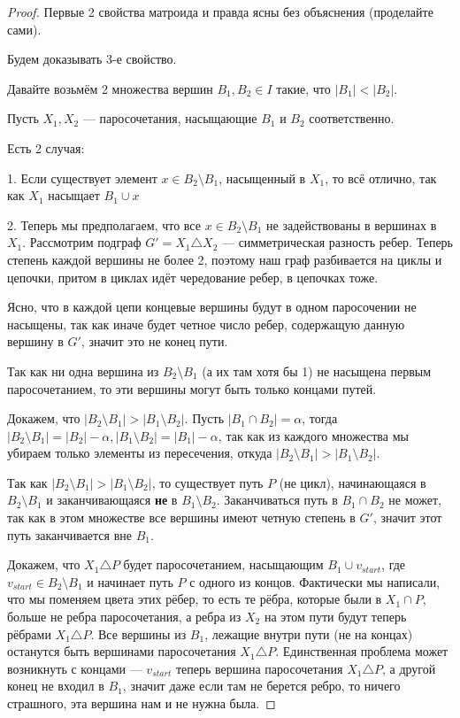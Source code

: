 \documentclass[a4paper, 12pt]{article}
\begin{document}
\begin{proof}
  Первые 2 свойства матроида и правда ясны без объяснения (проделайте сами).

  Будем доказывать 3-е свойство.

  Давайте возьмём 2 множества вершин $B_1, B_2 \in I$ такие, что $|B_1| < |B_2|$.

  Пусть $X_1, X_2$ --- паросочетания, насыщающие $B_1$ и $B_2$ 
  соответственно.

  Есть 2 случая:

  1. Если существует элемент $x \in B_2 \setminus B_1$, насыщенный в $X_1$, то всё
  отлично, так как $X_1$ насыщает $B_1 \cup x$ 

  2. Теперь мы предполагаем, что все $x \in B_2 \setminus B_1$ не задействованы
  в вершинах в $X_1$. Рассмотрим подграф $G' = X_1 \triangle X_2$ --- 
  симметрическая разность ребер. Теперь степень каждой вершины не более 2, поэтому
  наш граф разбивается на циклы и цепочки, притом в циклах идёт чередование ребер,
  в цепочках тоже.

  Ясно, что в каждой цепи концевые вершины будут в одном паросочении не насыщены, так
  как иначе будет 
  четное число ребер, содержащую данную вершину в $G'$, значит это не конец пути.

  Так как ни одна вершина из $B_2 \setminus B_1$ (а их там хотя бы 1) не насыщена
  первым паросочетанием, то эти вершины могут быть только концами путей.

  Докажем, что $|B_2 \setminus B_1| > |B_1 \setminus B_2|$. Пусть $|B_1 \cap B_2| 
  = \alpha$, тогда $|B_2 \setminus B_1| = |B_2| - \alpha, |B_1 \setminus B_2| = 
  |B_1| - \alpha$, так как из каждого множества мы убираем только элементы из 
  пересечения, откуда $|B_2 \setminus B_1| > |B_1 \setminus B_2|$.

  Так как $|B_2 \setminus B_1| > |B_1 \setminus B_2|$, то существует путь $P$ (не
  цикл),
  начинающаяся в $B_2 \setminus B_1$ и заканчивающаяся {\bf не} в $B_1 \setminus
  B_2$. Заканчиваться путь в $B_1 \cap B_2$ не может, так как в этом множестве все
  вершины имеют четную степень в $G'$, значит этот путь заканчивается вне $B_1$.

  Докажем, что $X_1 \triangle P$ будет паросочетанием, насыщающим 
  $B_1 \cup v_{start}$, где $v_{start} \in B_2 \setminus B_1$ и начинает путь 
  $P$ с одного из концов. Фактически мы написали, что мы поменяем цвета этих
  рёбер, то есть те рёбра, которые были в $X_1 \cap P$, больше не ребра паросочетания,
  а ребра из $X_2$ на этом пути будут теперь рёбрами $X_1 \triangle P$. Все вершины из
  $B_1$,
  лежащие внутри пути (не на концах) останутся быть вершинами паросочетания 
  $X_1 \triangle P$. Единственная проблема может возникнуть с концами --- $v_{start}$
  теперь вершина паросочетания $X_1 \triangle P$, а другой конец не входил в $B_1$,
  значит даже если там не берется ребро, то ничего страшного, эта вершина нам и не
  нужна была.
\end{proof}
\end{document}
